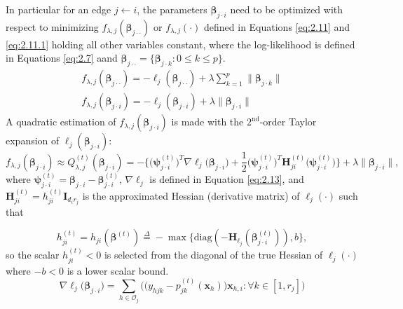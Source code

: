\documentclass[twoside,11pt]{article}
\let\mc\mathcal
\let\mbf\mathbf
\begin{document}
In particular for an edge $j\leftarrow i$, the parameters $\bm\beta_{j\cdot i}$ need to be optimized with respect to minimizing $f_{\lambda,j}(\bm\beta_{j\cdot\cdot})$ or $f_{\lambda,j}(\cdot)$ defined in Equations \eqref{eq:2.11} and  \eqref{eq:2.11.1} holding all other variables constant, where the log-likelihood is defined in Equations \eqref{eq:2.7} aand $\bm\beta_{j\cdot\cdot}=\{\bm\beta_{j\cdot k}: 0\leq k\leq p \}$.\begin{align}
    f_{\lambda,j}(\bm\beta_{j\cdot \cdot})=-\ell_j(\bm\beta_{j\cdot \cdot})+\lambda\sum_{k=1}^{p}\lVert\bm\beta_{j\cdot k}\rVert \label{eq:2.11}
    \\
    f_{\lambda,j}(\bm\beta_{j\cdot i})=-\ell_j(\bm\beta_{j\cdot i})+\lambda\lVert\bm\beta_{j\cdot i}\rVert \label{eq:2.11.1}
\end{align}
A quadratic estimation of $f_{\lambda,j}(\bm\beta_{j\cdot i})$ is made with the $2^\text{nd}$-order Taylor expansion of $\ell_j(\bm\beta_{j\cdot i})$:
\begin{equation}
    f_{\lambda,j}(\bm\beta_{j\cdot i})\approx Q_{\lambda,j}^{(t)}(\bm\beta_{j\cdot i})=-\bigg\{
    \Big(\bm\psi_{j\cdot i}^{(t)}\Big)^T
    \nabla\ell_j \Big(\bm\beta_{j\cdot i}\Big)
    +\frac{1}{2}\Big(\bm\psi_{j\cdot i}^{(t)}\Big)^T
    \mbf{H}_{ji}^{(t)}\Big(\bm \psi_{j\cdot i}^{(t)}\Big)
    \bigg\}
    +\lambda\lVert\bm\beta_{j\cdot i}\rVert,
\end{equation}
\noindent where $\bm\psi_{j\cdot i}^{(t)}=\bm\beta_{j\cdot i}-\bm\beta_{j\cdot i}^{(t)}$, $\nabla\ell_j$ is defined in Equation \eqref{eq:2.13}, and $\mbf{H}_{ji}^{(t)}=h_{ji}^{(t)}\mbf{I}_{d_i r_j}$ is the approximated Hessian (derivative matrix) of $\ell_j(\cdot)$ such that

\begin{equation*}
    h_{ji}^{(t)}=h_{ji}(\bm\beta^{(t)})\overset{\Delta}{=}-\max\{\text{diag}(-\mbf{H}_{\ell_j}(\bm\beta_{j\cdot i}^{(t)})),b\},
\end{equation*}
\noindent so the scalar $h_{ji}^{(t)}<0$ is selected from the diagonal of the true Hessian of $\ell_j(\cdot)$ where $-b<0$ is a lower scalar bound.\begin{equation}
    \nabla\ell_j \Big(\bm\beta_{j\cdot i}\Big)=\sum_{h\in\mc{O}_j}
    \bigg(\big(y_{hjk}-p_{jk}^{(t)}(\mbf x_h)\big)\mbf x_{h,i}: \forall k \in [1,r_j]\bigg)
    \label{eq:2.13}
\end{equation}
\end{document}
